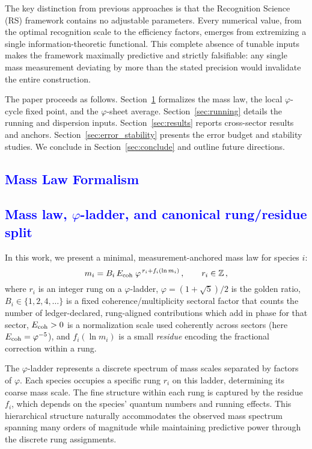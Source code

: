 \documentclass[%
amsmath,amssymb,
aps,
prb,
floatfix,showkeys
]{revtex4-2}
\newcommand{\modif}[1]{\textcolor{blue}{#1}}
\begin{document}
The key distinction from previous approaches is that the Recognition Science (RS) framework contains no adjustable parameters. Every numerical value, from the optimal recognition scale to the efficiency factors, emerges from extremizing a single information-theoretic functional. This complete absence of tunable inputs makes the framework maximally predictive and strictly falsifiable: any single mass measurement deviating by more than the stated precision would invalidate the entire construction.

The paper proceeds as follows. Section~\ref{sec:formalism} formalizes the mass law, the local $\varphi$-cycle fixed point, and the $\varphi$-sheet average. Section~\ref{sec:running} details the running and dispersion inputs. Section~\ref{sec:results} reports cross-sector results and anchors. Section~\ref{sec:error_stability} presents the error budget and stability studies. We conclude in Section~\ref{sec:conclude} and outline future directions.

{\modif{\section{Mass Law Formalism}
\label{sec:formalism}}}

{\modif{\subsection{Mass law, $\varphi$-ladder, and canonical rung/residue split}
\label{subsec:mass-law}}}

In this work, we present a minimal, measurement-anchored mass law for species $i$:
\begin{equation}
  m_i = B_i\,E_{\rm coh}\;\varphi^{\,r_i+f_i(\ln m_i)}\,,\qquad r_i\in\mathbb{Z}\,,
  \label{eq:mass_law_intro}
\end{equation}
where $r_i$ is an integer rung on a $\varphi$-ladder, $\varphi = (1+\sqrt{5})/2$ is the golden ratio, $B_i\in\{1,2,4,\dots\}$ is a fixed coherence/multiplicity sectoral factor that counts the number of ledger-declared, rung-aligned contributions which add in phase for that sector, $E_{\rm coh}>0$ is a normalization scale used coherently across sectors (here $E_{\rm coh}=\varphi^{-5}$), and $f_i(\ln m_i)$ is a small \emph{residue} encoding the fractional correction within a rung.

The $\varphi$-ladder represents a discrete spectrum of mass scales separated by factors of $\varphi$. Each species occupies a specific rung $r_i$ on this ladder, determining its coarse mass scale. The fine structure within each rung is captured by the residue $f_i$, which depends on the species' quantum numbers and running effects. This hierarchical structure naturally accommodates the observed mass spectrum spanning many orders of magnitude while maintaining predictive power through the discrete rung assignments.
\end{document}
